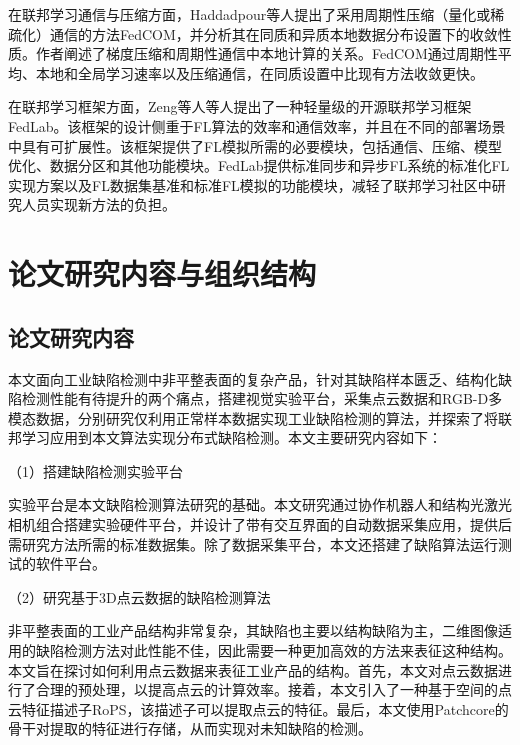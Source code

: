 在联邦学习通信与压缩方面\cite{linDefensiveQuantizationWhen2019,linDeepGradientCompression2020,reisizadehFedPAQCommunicationEfficientFederated2020,zhouCommunicationefficientFederatedLearning2023,zhouCommunicationefficientFederatedLearning2023}，Haddadpour等人\cite{haddadpourFederatedLearningCompression2021}提出了采用周期性压缩（量化或稀疏化）通信的方法FedCOM，并分析其在同质和异质本地数据分布设置下的收敛性质。作者阐述了梯度压缩和周期性通信中本地计算的关系。FedCOM通过周期性平均、本地和全局学习速率以及压缩通信，在同质设置中比现有方法收敛更快。

在联邦学习框架方面，Zeng等人\cite{zengFedLabFlexibleFederated2022}等人提出了一种轻量级的开源联邦学习框架FedLab。该框架的设计侧重于FL算法的效率和通信效率，并且在不同的部署场景中具有可扩展性。该框架提供了FL模拟所需的必要模块，包括通信、压缩、模型优化、数据分区和其他功能模块。FedLab提供标准同步和异步FL系统的标准化FL实现方案以及FL数据集基准和标准FL模拟的功能模块，减轻了联邦学习社区中研究人员实现新方法的负担。


\section{论文研究内容与组织结构}
\subsection{论文研究内容}
本文面向工业缺陷检测中非平整表面的复杂产品，针对其缺陷样本匮乏、结构化缺陷检测性能有待提升的两个痛点，搭建视觉实验平台，采集点云数据和RGB-D多模态数据，分别研究仅利用正常样本数据实现工业缺陷检测的算法，并探索了将联邦学习应用到本文算法实现分布式缺陷检测。本文主要研究内容如下：

（1）搭建缺陷检测实验平台

实验平台是本文缺陷检测算法研究的基础。本文研究通过协作机器人和结构光激光相机组合搭建实验硬件平台，并设计了带有交互界面的自动数据采集应用，提供后需研究方法所需的标准数据集。除了数据采集平台，本文还搭建了缺陷算法运行测试的软件平台。

（2）研究基于3D点云数据的缺陷检测算法

非平整表面的工业产品结构非常复杂，其缺陷也主要以结构缺陷为主，二维图像适用的缺陷检测方法对此性能不佳，因此需要一种更加高效的方法来表征这种结构。本文旨在探讨如何利用点云数据来表征工业产品的结构。首先，本文对点云数据进行了合理的预处理，以提高点云的计算效率。接着，本文引入了一种基于空间的点云特征描述子RoPS，该描述子可以提取点云的特征。最后，本文使用Patchcore的骨干对提取的特征进行存储，从而实现对未知缺陷的检测。

